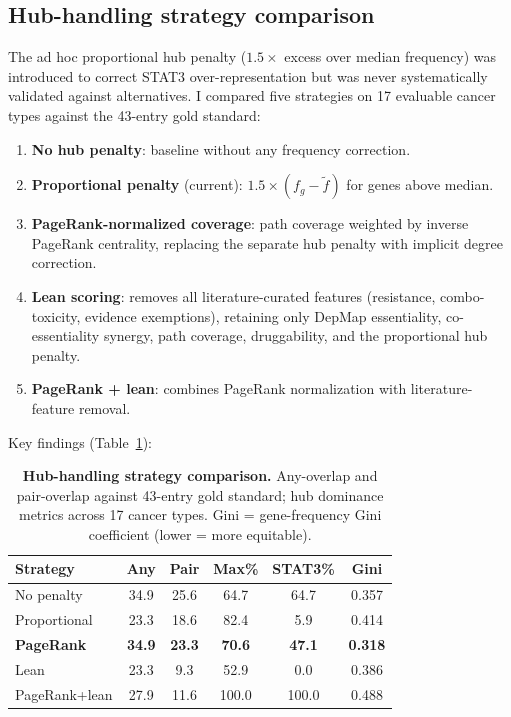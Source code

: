 \documentclass[11pt]{article}
\begin{document}
\subsection{Hub-handling strategy comparison}
\label{sec:hub_strategies}
The ad hoc proportional hub penalty ($1.5\times$ excess over median frequency) was introduced to correct STAT3 over-representation but was never systematically validated against alternatives. I compared five strategies on 17 evaluable cancer types against the 43-entry gold standard:
\begin{enumerate}
\item \textbf{No hub penalty}: baseline without any frequency correction.
\item \textbf{Proportional penalty} (current): $1.5 \times (f_g - \tilde{f})$ for genes above median.
\item \textbf{PageRank-normalized coverage}: path coverage weighted by inverse PageRank centrality, replacing the separate hub penalty with implicit degree correction.
\item \textbf{Lean scoring}: removes all literature-curated features (resistance, combo-toxicity, evidence exemptions), retaining only DepMap essentiality, co-essentiality synergy, path coverage, druggability, and the proportional hub penalty.
\item \textbf{PageRank + lean}: combines PageRank normalization with literature-feature removal.
\end{enumerate}

\noindent Key findings (Table~\ref{tab:hub_strategies_supp}):

\begin{table}[!htb]
\centering
\scriptsize
\caption{\textbf{Hub-handling strategy comparison.} Any-overlap and pair-overlap against 43-entry gold standard; hub dominance metrics across 17 cancer types. Gini = gene-frequency Gini coefficient (lower = more equitable).}
\label{tab:hub_strategies_supp}
\begin{tabular}{@{}lccccc@{}}
\toprule
Strategy & Any & Pair & Max\% & STAT3\% & Gini \\
\midrule
No penalty & 34.9 & 25.6 & 64.7 & 64.7 & 0.357 \\
Proportional & 23.3 & 18.6 & 82.4 & 5.9 & 0.414 \\
\textbf{PageRank} & \textbf{34.9} & \textbf{23.3} & \textbf{70.6} & \textbf{47.1} & \textbf{0.318} \\
Lean & 23.3 & 9.3 & 52.9 & 0.0 & 0.386 \\
PageRank+lean & 27.9 & 11.6 & 100.0 & 100.0 & 0.488 \\
\bottomrule
\end{tabular}
\end{table}
\end{document}
